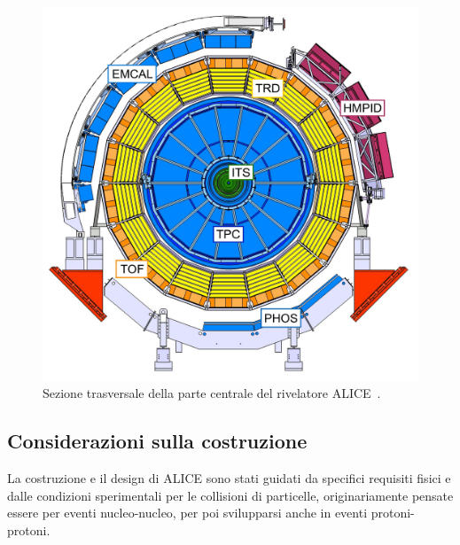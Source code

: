 \newpage

    \begin{figure}[t]
        \centering
        \includegraphics[width=0.75\linewidth]{res/fig/2-chapter/3-ALICE-detector-center.jpg}
        \caption{Sezione trasversale della parte centrale del rivelatore ALICE~\cite{Gagliardi_2019}.}
        \label{fig:2-3-ALICE-detector-center}
    \end{figure}

    \subsection{Considerazioni sulla costruzione}
        La costruzione e il design di ALICE sono stati guidati da specifici requisiti fisici e dalle condizioni sperimentali per le collisioni di particelle, originariamente pensate essere per eventi nucleo-nucleo, per poi svilupparsi anche in eventi protoni-protoni.

